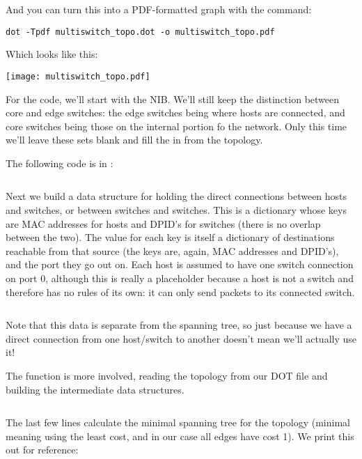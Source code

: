 And you can turn this into a PDF-formatted graph with the command:

\begin{verbatim}
dot -Tpdf multiswitch_topo.dot -o multiswitch_topo.pdf
\end{verbatim}

Which looks like this:

\texttt{[image: multiswitch\_topo.pdf]}

For the code, we'll start with the NIB.  We'll still keep the distinction between core and edge switches:
the edge switches being where hosts are connected, and core switches being those on the internal
portion fo the network.  Only this time we'll leave these sets blank and fill the in from the topology.

The following code is in  :

\inputminted[firstline=15,lastline=16]{python}{code/multiswitch_topologies/network_information_base_from_file.py}

Next we build a data structure for holding the direct connections between hosts and switches, or
between switches and switches.  This is a dictionary whose keys are MAC addresses for hosts and DPID's for
switches (there is no overlap between the two).  The value for each key is itself a dictionary of destinations
reachable from that source (the keys are, again, MAC addresses and DPID's), and the port they go out on.
Each host is assumed to have one switch connection on port 0, although this is really a placeholder because a host is not
a switch and therefore has no rules of its own: it can only send packets to its connected switch.  

\inputminted[firstline=18,lastline=29]{python}{code/multiswitch_topologies/network_information_base_from_file.py}

Note that this data is separate from the spanning tree, so just because we have a direct connection from one
host/switch to another doesn't mean we'll actually use it!

The  function is more involved, reading the topology from our DOT file and building the 
intermediate data structures.

\inputminted[firstline=30,lastline=64]{python}{code/multiswitch_topologies/network_information_base_from_file.py}

The last few lines calculate the minimal spanning tree for the topology (minimal meaning using the least cost, and
in our case all edges have cost 1).  We print this out for reference:

